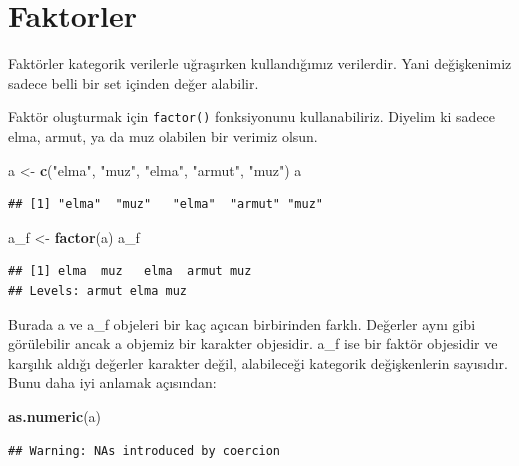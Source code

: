 \documentclass[
]{book}
\newenvironment{Shaded}{\begin{snugshade}}{\end{snugshade}}
\newcommand{\KeywordTok}[1]{\textcolor[rgb]{0.13,0.29,0.53}{\textbf{#1}}}
\newcommand{\NormalTok}[1]{#1}
\newcommand{\StringTok}[1]{\textcolor[rgb]{0.31,0.60,0.02}{#1}}
\begin{document}
\hypertarget{faktorler}{%
\chapter{Faktorler}\label{faktorler}}

Faktörler kategorik verilerle uğraşırken kullandığımız verilerdir. Yani değişkenimiz sadece belli bir set içinden değer alabilir.

Faktör oluşturmak için \texttt{factor()} fonksiyonunu kullanabiliriz. Diyelim ki sadece elma, armut, ya da muz olabilen bir verimiz olsun.

\begin{Shaded}
\begin{Highlighting}[]
\NormalTok{a <{-}}\StringTok{  }\KeywordTok{c}\NormalTok{(}\StringTok{"elma"}\NormalTok{, }\StringTok{"muz"}\NormalTok{, }\StringTok{"elma"}\NormalTok{, }\StringTok{"armut"}\NormalTok{, }\StringTok{"muz"}\NormalTok{)}
\NormalTok{a}
\end{Highlighting}
\end{Shaded}

\begin{verbatim}
## [1] "elma"  "muz"   "elma"  "armut" "muz"
\end{verbatim}

\begin{Shaded}
\begin{Highlighting}[]
\NormalTok{a\_f <{-}}\StringTok{ }\KeywordTok{factor}\NormalTok{(a)}
\NormalTok{a\_f}
\end{Highlighting}
\end{Shaded}

\begin{verbatim}
## [1] elma  muz   elma  armut muz  
## Levels: armut elma muz
\end{verbatim}

Burada a ve a\_f objeleri bir kaç açıcan birbirinden farklı. Değerler aynı gibi görülebilir ancak a objemiz bir karakter objesidir. a\_f ise bir faktör objesidir ve karşılık aldığı değerler karakter değil, alabileceği kategorik değişkenlerin sayısıdır. Bunu daha iyi anlamak açısından:

\begin{Shaded}
\begin{Highlighting}[]
\KeywordTok{as.numeric}\NormalTok{(a)}
\end{Highlighting}
\end{Shaded}

\begin{verbatim}
## Warning: NAs introduced by coercion
\end{verbatim}
\end{document}
